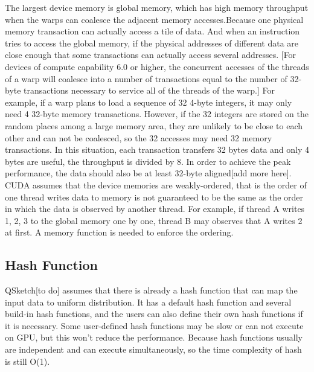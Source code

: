 \documentclass[conference]{IEEEtran}
\begin{document}
The largest device memory is global memory, which has high memory throughput when the warps can coalesce the adjacent memory accesses.Because one physical memory transaction can actually access a tile of data. And when an instruction tries to access the global memory, if the physical addresses of different data are close enough that some transactions can actually access several addresses. [For devices of compute capability 6.0 or higher, the concurrent accesses of the threads of a warp will coalesce into a number of transactions equal to the number of 32-byte transactions necessary to service all of the threads of the warp.]  For example, if a warp plans to load a sequence of 32 4-byte integers, it may only need 4 32-byte memory transactions. However, if the 32 integers are stored on the random places among a large memory area, they are unlikely to be close to each other and can not be coalesced, so the 32 accesses may need 32 memory transactions. In this situation, each transaction transfers 32 bytes data and only 4 bytes are useful, the throughput is divided by 8. In order to achieve the peak performance, the data should also be at least 32-byte aligned[add more here]. 
CUDA assumes that the device memories are weakly-ordered, that is the order of one thread writes data to memory is not guaranteed to be the same as the order in which the data is observed by another thread. For example, if thread A writes 1, 2, 3 to the global memory one by one, thread B may observes that A writes 2 at first. A memory function is needed to enforce the ordering. 
\subsection{Hash Function}
QSketch[to do] assumes that there is already a hash function that can map the input data to uniform distribution. It has a default hash function and several build-in hash functions, and the users can also define their own hash functions if it is necessary. Some user-defined hash functions may be slow or can not execute on GPU, but this won't reduce the performance. Because hash functions usually are independent and can execute simultaneously, so the time complexity of hash is still O(1).
\end{document}
